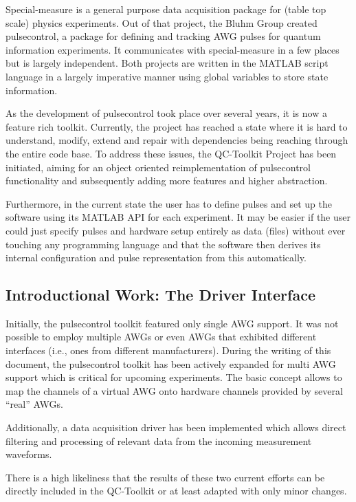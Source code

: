 \documentclass[a4paper,12pt]{article}
\begin{document}
Special-measure is a general purpose data acquisition package for (table top scale) physics experiments. Out of that project, the Bluhm Group created pulsecontrol, a package for defining and tracking AWG pulses for quantum information experiments. It communicates with special-measure in a few places but is largely independent. Both projects are written in the MATLAB script language in a largely imperative manner using global variables to store state information.

As the development of pulsecontrol took place over several years, it is now a feature rich toolkit. Currently, the project has reached a state where it is hard to understand, modify, extend and repair with dependencies being reaching through the entire code base.
To address these issues, the QC-Toolkit Project has been initiated, aiming for an object oriented reimplementation of pulsecontrol functionality and subsequently adding more features and higher abstraction.

Furthermore, in the current state the user has to define pulses and set up the software using its MATLAB API for each experiment. It may be easier if the user could just specify pulses and hardware setup entirely as data (files) without ever touching any programming language and that the software then derives its internal configuration and pulse representation from this automatically.

\subsection{Introductional Work: The Driver Interface}
Initially, the pulsecontrol toolkit featured only single AWG support. It was not possible to employ multiple AWGs or even AWGs that exhibited different interfaces (i.e., ones from different manufacturers). During the writing of this document, the pulsecontrol toolkit has been actively expanded for multi AWG support which is critical for upcoming experiments. The basic concept allows to map the channels of a virtual AWG onto hardware channels provided by several ``real'' AWGs.

Additionally, a data acquisition driver has been implemented which allows direct filtering and processing of relevant data from the incoming measurement waveforms.

There is a high likeliness that the results of these two current efforts can be directly included in the QC-Toolkit or at least adapted with only minor changes.
\end{document}
